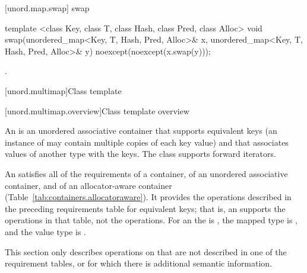 [unord.map.swap]{ swap}

%
%
\begin{itemdecl}
template <class Key, class T, class Hash, class Pred, class Alloc>
  void swap(unordered_map<Key, T, Hash, Pred, Alloc>& x,
            unordered_map<Key, T, Hash, Pred, Alloc>& y)
    noexcept(noexcept(x.swap(y)));
\end{itemdecl}

\begin{itemdescr}
\pnum\effects {}.
\end{itemdescr}

[unord.multimap]{Class template }%

[unord.multimap.overview]{Class template  overview}

\pnum
{}%
%
An  is an unordered associative container
that supports equivalent keys (an instance of  may contain
multiple copies of each key value) and that associates values of
another type  with the keys.
The  class
supports forward iterators.

\pnum
An  satisfies all of the requirements of a container, of an
unordered associative container, and of an allocator-aware container
(Table~\ref{tab:containers.allocatoraware}). It provides the operations described in the
preceding requirements table for equivalent keys; that is, an 
supports the  operations in that table, not the  operations.
For an  the  is , the
mapped type is , and the value type is .

\pnum
This section only describes operations on 
that are not described in one of the requirement tables, or for which
there is additional semantic information.

